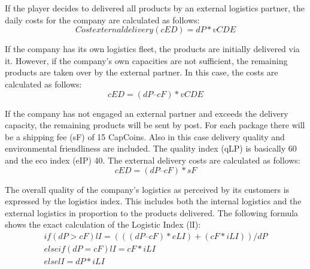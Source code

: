 If the player decides to delivered all products by an external logistics partner, the daily costs for the company are calculated as follows:
\begin{equation}
    Cost external delivery (cED) = dP * vCDE
\end{equation}

If the company has its own logistics fleet, the products are initially delivered via it. However, if the company's own capacities are not sufficient, the remaining products are taken over by the external partner. In this case, the costs are calculated as follows: 
\begin{equation}
    cED = ( dP – cF ) * vCDE
\end{equation}

If the company has not engaged an external partner and exceeds the delivery capacity, the remaining products will be sent by post. For each package there will be a shipping fee (sF) of 15 CapCoins. Also in this case delivery quality and environmental friendliness are included. The quality index (qLP) is basically 60 and the eco index (eIP) 40. The external delivery costs are calculated as follows:  
\begin{equation}
    cED = ( dP – cF ) * sF
\end{equation}

The overall quality of the company's logistics as perceived by its customers is expressed by the logistics index. This includes both the internal logistics and the external logistics in proportion to the products delivered. The following formula shows the exact calculation of the Logistic Index (lI):
\begin{equation}
\begin{aligned}
    if ( dP > cF ) lI = { ((( dP – cF) * eLI ) + ( cF * iLI )) / dP} \\
    elseif ( dP = cF ) lI = { cF * iLI } \\
    else lI = { dP * iLI }  
\end{aligned}
\end{equation}